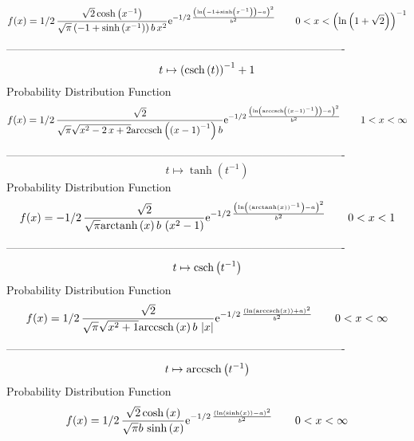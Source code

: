 \documentclass[12pt]{article}
\begin{document}
$$  f(x)=1/2\,{\frac {\sqrt {2}\cosh \left( {x}^{-1} \right) }{\sqrt {\pi}
 \left( -1+\sinh \left( {x}^{-1} \right)  \right) b\,{x}^{2}}{{\rm e}^
{-1/2\,{\frac { \left( \ln  \left( -1+\sinh \left( {x}^{-1} \right) 
 \right) -a \right) ^{2}}{{b}^{2}}}}}}
 \qquad0
 < x <  \left( \ln  \left( 1+\sqrt {2} \right)  \right) ^{-1}
$$-------------------------------------------------------------------------------------------  \\$$t\mapsto  \left( {\rm csch} \left(t\right) \right) ^{-1}+1
$$Probability Distribution Function 
$$  f(x)=1/2\,{\frac {\sqrt {2}}{\sqrt {\pi}\sqrt {{x}^{2}-2\,x+2}{\rm arccsch}
 \left( \left( x-1 \right) ^{-1}\right)b}{{\rm e}^{-1/2\,{\frac {
 \left( \ln  \left( {\rm arccsch} \left( \left( x-1 \right) ^{-1}
\right) \right) -a \right) ^{2}}{{b}^{2}}}}}}
 \qquad1
 < x < \infty 
$$-------------------------------------------------------------------------------------------  \\$$t\mapsto \tanh \left( {t}^{-1} \right) 
$$Probability Distribution Function 
$$  f(x)=-1/2\,{\frac {\sqrt {2}}{\sqrt {\pi}{\rm arctanh} \left(x\right)b\,
 \left( {x}^{2}-1 \right) }{{\rm e}^{-1/2\,{\frac { \left( \ln 
 \left(  \left( {\rm arctanh} \left(x\right) \right) ^{-1} \right) -a
 \right) ^{2}}{{b}^{2}}}}}}
 \qquad0
 < x < 1
$$-------------------------------------------------------------------------------------------  \\$$t\mapsto {\rm csch} \left({t}^{-1}\right)
$$Probability Distribution Function 
$$  f(x)=1/2\,{\frac {\sqrt {2}}{\sqrt {\pi}\sqrt {{x}^{2}+1}{\rm arccsch} 
\left(x\right)b\, \left| x \right| }{{\rm e}^{-1/2\,{\frac { \left( 
\ln  \left( {\rm arccsch} \left(x\right) \right) +a \right) ^{2}}{{b}^
{2}}}}}}
 \qquad0
 < x < \infty 
$$-------------------------------------------------------------------------------------------  \\$$t\mapsto {\rm arccsch} \left({t}^{-1}\right)
$$Probability Distribution Function 
$$  f(x)=1/2\,{\frac {\sqrt {2}\cosh \left( x \right) }{\sqrt {\pi}b\,\sinh
 \left( x \right) }{{\rm e}^{-1/2\,{\frac { \left( \ln  \left( \sinh
 \left( x \right)  \right) -a \right) ^{2}}{{b}^{2}}}}}}
 \qquad0
 < x < \infty 
$$
\end{document}
